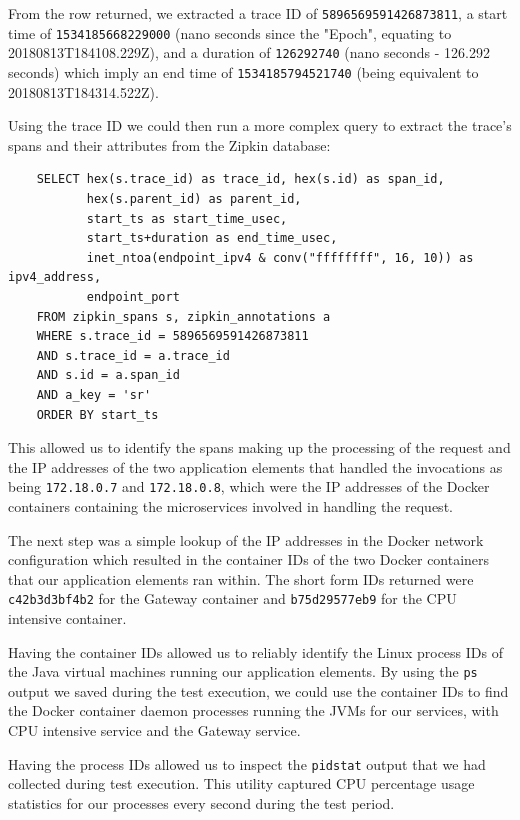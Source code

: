 From the row returned, we extracted a trace ID of \texttt{5896569591426873811}, a start time of \texttt{1534185668229000} (nano seconds since the "Epoch", equating to 20180813T184108.229Z), and a duration of \texttt{126292740} (nano seconds - 126.292 seconds)	which imply an end time of \texttt{1534185794521740} (being equivalent to 20180813T184314.522Z).

Using the trace ID we could then run a more complex query to extract the trace's spans and their attributes from the Zipkin database:

\lstset{language=SQL}
\begin{lstlisting}
	SELECT hex(s.trace_id) as trace_id, hex(s.id) as span_id,
	       hex(s.parent_id) as parent_id,
	       start_ts as start_time_usec, 
	       start_ts+duration as end_time_usec,
	       inet_ntoa(endpoint_ipv4 & conv("ffffffff", 16, 10)) as ipv4_address,
	       endpoint_port
	FROM zipkin_spans s, zipkin_annotations a
	WHERE s.trace_id = 5896569591426873811
	AND s.trace_id = a.trace_id
	AND s.id = a.span_id
	AND a_key = 'sr'
	ORDER BY start_ts
\end{lstlisting}

This allowed us to identify the spans making up the processing of the request and the IP addresses of the two application elements that handled the invocations as being \texttt{172.18.0.7} and \texttt{172.18.0.8}, which were the IP addresses of the Docker containers containing the microservices involved in handling the request.

The next step was a simple lookup of the IP addresses in the Docker network configuration which resulted in the container IDs of the two Docker containers that our application elements ran within.  The short form IDs returned were \texttt{c42b3d3bf4b2} for the Gateway container and \texttt{b75d29577eb9} for the CPU intensive container.

Having the container IDs allowed us to reliably identify the Linux process IDs of the Java virtual machines running our application elements.  By using the \texttt{ps} output we saved during the test execution, we could use the container IDs to find the Docker container daemon  processes running the JVMs for our services, with CPU intensive service and the Gateway service.

Having the process IDs allowed us to inspect the \texttt{pidstat} output that we had collected during test execution.   This utility captured CPU percentage usage statistics for our processes every second during the test period.

